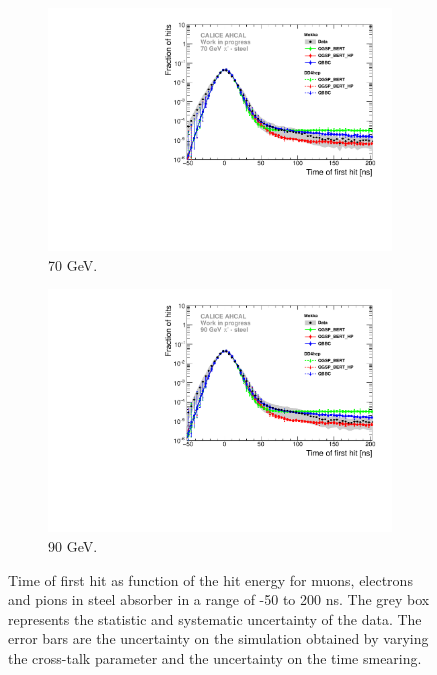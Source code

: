 \begin{figure}[htbp!]
\begin{subfigure}[t]{0.5\textwidth}
    \includegraphics[width=1\textwidth]{../Thesis_Plots/Timing/Pions/Plots/Comparison_SimData_Pion70GeV_LateClusters.pdf}
    \caption{70 GeV.} \label{fig:dNdt_SimData_70GeV}
  \end{subfigure}
  \hfill
  \begin{subfigure}[t]{0.5\textwidth}
    \centering
    \includegraphics[width=1\textwidth]{../Thesis_Plots/Timing/Pions/Plots/Comparison_SimData_Pion90GeV_LateClusters.pdf}
    \caption{90 GeV.} \label{fig:dNdt_SimData_90GeV}
  \end{subfigure}
  \caption{Time of first hit as function of the hit energy for muons, electrons and pions in steel absorber in a range of -50 to 200 ns. The grey box represents the statistic and systematic uncertainty of the data. The error bars are the uncertainty on the simulation obtained by varying the cross-talk parameter and the uncertainty on the time smearing.}
\end{figure}

